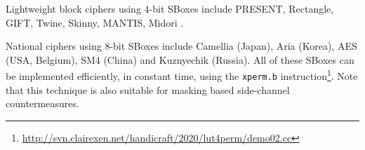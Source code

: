 Lightweight block ciphers using $4$-bit SBoxes include
PRESENT\cite{block:present},
Rectangle\cite{block:rectangle},
GIFT\cite{block:gift},
Twine\cite{block:twine},
Skinny, MANTIS\cite{block:skinny},
Midori \cite{block:midori}.

National ciphers using $8$-bit SBoxes include
Camellia\cite{block:camellia} (Japan), 
Aria\cite{block:aria} (Korea),
AES\cite{nist:fips:197} (USA, Belgium),
SM4\cite{block:sm4:1} (China)
and Kuznyechik (Russia).
All of these SBoxes can be implemented efficiently, in constant
time, using the {\tt xperm.b} instruction\footnote{
    \url{http://svn.clairexen.net/handicraft/2020/lut4perm/demo02.cc}
}.
Note that this technique is also suitable for masking based
side-channel countermeasures.

%
